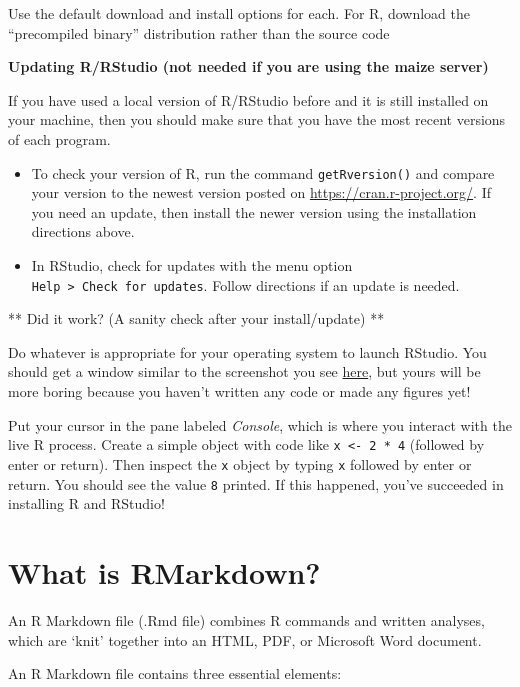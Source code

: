 \documentclass[
]{book}
\begin{document}
Use the default download and install options for each. For R, download the ``precompiled binary'' distribution rather than the source code

\textbf{Updating R/RStudio (not needed if you are using the maize server)}

If you have used a local version of R/RStudio before and it is still installed on your machine, then you should make sure that you have the most recent versions of each program.

\begin{itemize}
\item
  To check your version of R, run the command \texttt{getRversion()} and compare your version to the newest version posted on \url{https://cran.r-project.org/}. If you need an update, then install the newer version using the installation directions above.
\item
  In RStudio, check for updates with the menu option \texttt{Help\ \textgreater{}\ Check\ for\ updates}. Follow directions if an update is needed.
\end{itemize}

** Did it work? (A sanity check after your install/update) **

Do whatever is appropriate for your operating system to launch
RStudio. You should get a window similar to the screenshot you see
\href{https://www.rstudio.com/wp-content/uploads/2014/04/rstudio-workbench.png}{here},
but yours will be more boring because you haven't written any code
or made any figures yet!

Put your cursor in the pane labeled \emph{Console}, which is where you
interact with the live R process. Create a simple object with code
like \texttt{x\ \textless{}-\ 2\ *\ 4} (followed by enter or return). Then inspect the
\texttt{x} object by typing \texttt{x} followed by enter or return. You should see
the value \texttt{8} printed. If this happened, you've succeeded in
installing R and RStudio!

\hypertarget{what-is-rmarkdown}{%
\section{What is RMarkdown?}\label{what-is-rmarkdown}}

An R Markdown file (.Rmd file) combines R commands and written analyses, which are `knit' together into an HTML, PDF, or Microsoft Word document.

An R Markdown file contains three essential elements:
\end{document}
